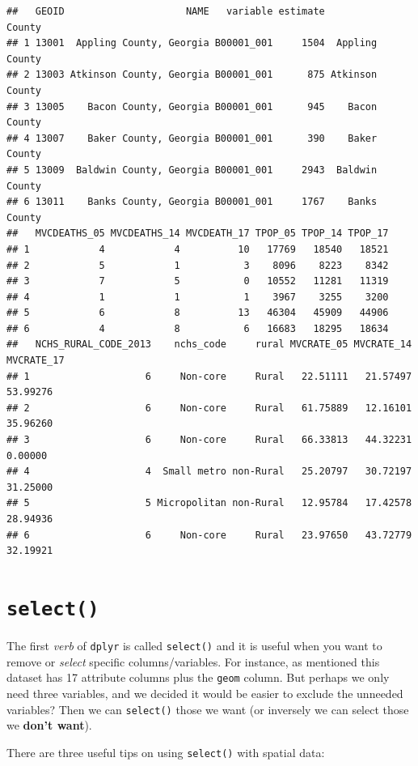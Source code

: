 \documentclass[
]{book}
\begin{document}
\begin{verbatim}
##   GEOID                     NAME   variable estimate          County
## 1 13001  Appling County, Georgia B00001_001     1504  Appling County
## 2 13003 Atkinson County, Georgia B00001_001      875 Atkinson County
## 3 13005    Bacon County, Georgia B00001_001      945    Bacon County
## 4 13007    Baker County, Georgia B00001_001      390    Baker County
## 5 13009  Baldwin County, Georgia B00001_001     2943  Baldwin County
## 6 13011    Banks County, Georgia B00001_001     1767    Banks County
##   MVCDEATHS_05 MVCDEATHS_14 MVCDEATH_17 TPOP_05 TPOP_14 TPOP_17
## 1            4            4          10   17769   18540   18521
## 2            5            1           3    8096    8223    8342
## 3            7            5           0   10552   11281   11319
## 4            1            1           1    3967    3255    3200
## 5            6            8          13   46304   45909   44906
## 6            4            8           6   16683   18295   18634
##   NCHS_RURAL_CODE_2013    nchs_code     rural MVCRATE_05 MVCRATE_14 MVCRATE_17
## 1                    6     Non-core     Rural   22.51111   21.57497   53.99276
## 2                    6     Non-core     Rural   61.75889   12.16101   35.96260
## 3                    6     Non-core     Rural   66.33813   44.32231    0.00000
## 4                    4  Small metro non-Rural   25.20797   30.72197   31.25000
## 5                    5 Micropolitan non-Rural   12.95784   17.42578   28.94936
## 6                    6     Non-core     Rural   23.97650   43.72779   32.19921
\end{verbatim}

\hypertarget{select}{%
\section{\texorpdfstring{\texttt{select()}}{select()}}\label{select}}

The first \emph{verb} of \texttt{dplyr} is called \texttt{select()} and it is useful when you want to remove or \emph{select} specific columns/variables. For instance, as mentioned this dataset has 17 attribute columns plus the \texttt{geom} column. But perhaps we only need three variables, and we decided it would be easier to exclude the unneeded variables? Then we can \texttt{select()} those we want (or inversely we can select those we \textbf{don't want}).

There are three useful tips on using \texttt{select()} with spatial data:
\end{document}
